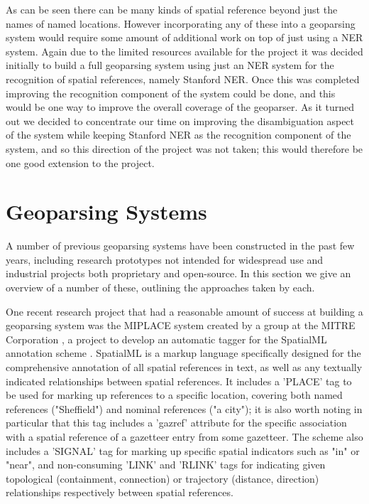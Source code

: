 \documentclass[12pt, a4paper]{report}
\begin{document}
As can be seen there can be many kinds of spatial reference beyond just the names of named locations. However incorporating any of these into a geoparsing system would require some amount of additional work on top of just using a NER system. Again due to the limited resources available for the project it was decided initially to build a full geoparsing system using just an NER system for the recognition of spatial references, namely Stanford NER. Once this was completed improving the recognition component of the system could be done, and this would be one way to improve the overall coverage of the geoparser. As it turned out we decided to concentrate our time on improving the disambiguation aspect of the system while keeping Stanford NER as the recognition component of the system, and so this direction of the project was not taken; this would therefore be one good extension to the project.

\section{Geoparsing Systems}

A number of previous geoparsing systems have been constructed in the past few years, including research prototypes not intended for widespread use and industrial projects both proprietary and open-source. In this section we give an overview of a number of these, outlining the approaches taken by each.

One recent research project that had a reasonable amount of success at building a geoparsing system was the MIPLACE system created by a group at the MITRE Corporation \citep{mani2010}, a project to develop an automatic tagger for the SpatialML annotation scheme \citep{spatialml2009}. SpatialML is a markup language specifically designed for the comprehensive annotation of all spatial references in text, as well as any textually indicated relationships between spatial references. It includes a 'PLACE' tag to be used for marking up references to a specific location, covering both named references ("Sheffield") and nominal references ("a city"); it is also worth noting in particular that this tag includes a 'gazref' attribute for the specific association with a spatial reference of a gazetteer entry from some gazetteer. The scheme also includes a 'SIGNAL' tag for marking up specific spatial indicators such as "in" or "near", and non-consuming 'LINK' and 'RLINK' tags for indicating given topological (containment, connection) or trajectory (distance, direction) relationships respectively between  spatial references.
\end{document}
